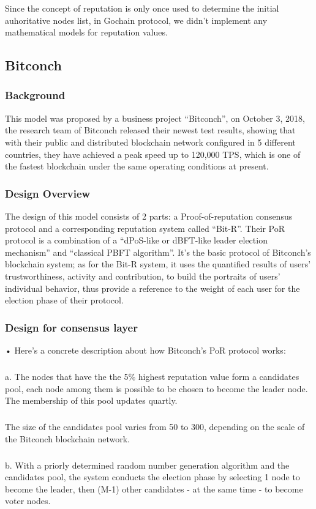 \documentclass[doublespacing]{bmcart}
\begin{document}
\begin{CJK*}{UTF8}{gbsn}
	Since the concept of reputation is only once used to determine the initial auhoritative nodes list, in Gochain protocol, we didn't implement any mathematical models for reputation values. 
	
	\subsection{Bitconch} 
	\subsubsection*{Background} 
	This model was proposed by a business project ``Bitconch'', on October 3, 2018, the research team of Bitconch released their newest test results, showing that with their public and distributed blockchain network configured in 5 different countries, they have achieved a peak speed up to 120,000 TPS, which is one of the fastest blockchain under the same operating conditions at present.  
	\subsubsection*{Design Overview}  
	The design of this model consists of 2 parts: a Proof-of-reputation consensus protocol and a corresponding reputation system called ``Bit-R''. Their PoR protocol is a combination of a ``dPoS-like or dBFT-like leader election mechanism'' and ``classical PBFT algorithm''. It's the basic protocol of Bitconch's blockchain system; as for the Bit-R system, it uses the quantified results of users' trustworthiness, activity and contribution, to build the portraits of users' individual behavior, thus provide a reference to the weight of each user for the election phase of their protocol.
	\subsubsection*{Design for consensus layer} 
	• Here's a concrete description about how Bitconch's PoR protocol works:
	\subparagraph{} 
	a. The nodes that have the the 5\% highest reputation value form a candidates pool, each node among them is possible to be chosen to become the leader node. The membership of this pool updates quartly.
	\subparagraph{} 
	The size of the candidates pool varies from 50 to 300, depending on the scale of the Bitconch blockchain network.
	\subparagraph{} 
	b. With a priorly determined random number generation algorithm and the candidates pool, the system conducts the election phase by selecting 1 node to become the leader, then (M-1) other candidates - at the same time - to become voter nodes.
	 

\end{CJK*}
\end{document}
